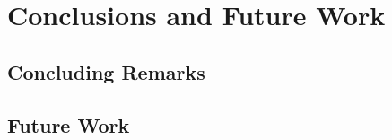 \chapter{Conclusions and Future Work}\label{chp:conclusions}


\section{Concluding Remarks}\label{sec:conclusions}



\section{Future Work}\label{sec:future_work}

